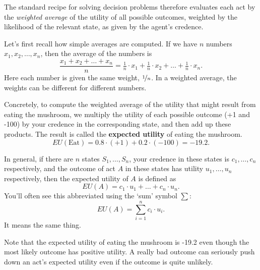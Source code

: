 The standard recipe for solving decision problems therefore evaluates
each act by the \emph{weighted average} of the utility of all possible
outcomes, weighted by the likelihood of the relevant state, as given
by the agent's credence.

Let's first recall how simple averages are computed. If we have $n$
numbers $x_1, x_2, \ldots, x_n$, then the average of the numbers is
\[
\frac{x_1 + x_2 + \ldots + x_n}{n} = \tfrac{1}{n} \cdot x_1 + \tfrac{1}{n} \cdot x_2 + \ldots + \tfrac{1}{n} \cdot x_n.
\]
Here each number is given the same weight, $\nicefrac{1}{n}$. In a
weighted average, the weights can be different for different numbers.

Concretely, to compute the weighted average of the utility that might
result  from eating the mushroom, we multiply the utility of each
possible outcome (+1 and -100) by your credence in the corresponding
state, and then add up these products. The result is called the
\textbf{expected utility} of eating the mushroom.
\[
EU(\text{Eat}) = 0.8 \cdot (+1) + 0.2 \cdot (-100) = -19.2.
\]

In general, if there are $n$ states $S_1,\ldots, S_n$, your credence
in these states is $c_1,\ldots,c_n$ respectively, and the outcome of
act $A$ in these states has utility $u_1,\ldots,u_n$ respectively,
then the expected utility of $A$ is defined as
\[
EU(A) = c_1 \cdot u_1 + \ldots + c_n \cdot u_n.
\]
You'll often see this abbreviated using the `sum' symbol $\sum$:
\[
EU(A) = \sum_{i=1}^n c_i \cdot u_i.
\]
It means the same thing.




Note that the expected utility of eating the mushroom is -19.2 even
though the most likely outcome has positive utility. A really bad
outcome can seriously push down an act's expected utility even if the
outcome is quite unlikely. 

